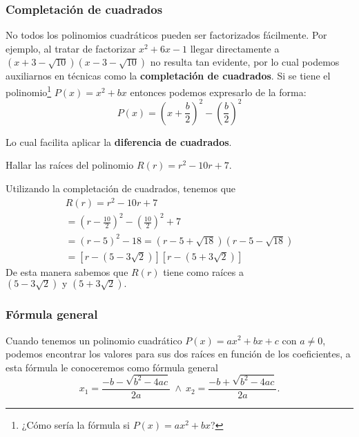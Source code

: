 \subsubsection{Completación de cuadrados}

No todos los polinomios cuadráticos pueden ser factorizados fácilmente.
Por ejemplo, al tratar de factorizar $x^2 + 6x - 1$ llegar directamente a $(x + 3 - \sqrt {10})(x-3-\sqrt {10})$ no resulta tan evidente, por lo cual podemos auxiliarnos en técnicas como la \textbf{completación de cuadrados}.
Si se tiene el polinomio\footnote{¿Cómo sería la fórmula si $P(x) = ax^2 + bx$?} $P(x) = x^2 + bx$ entonces podemos expresarlo de la forma:
\[
    P(x) = \left( x + \frac{b}{2} \right)^2 - \left( \frac{b}{2} \right)^2
\]

Lo cual facilita aplicar la \textbf{diferencia de cuadrados}.

\begin{section-example.tcb}
    Hallar las raíces del polinomio $R(r) = r^2 - 10r + 7.$
\end{section-example.tcb}
\begin{solution}
{
    Utilizando la completación de cuadrados, tenemos que
    \begin{gather*}
        R(r) = r^2 - 10r + 7\\
        = \left( r - \frac{10}{2} \right)^2 - \left( \frac{10}{2} \right)^2 + 7\\
        = \left( r - 5 \right)^2 - 18
        = \left( r - 5 + \sqrt {18} \right)\left( r - 5 - \sqrt {18} \right)\\
        = \left[ r - \left( 5 - 3\sqrt {2} \right)\right]\left[ r - \left( 5 + 3\sqrt {2} \right)\right]
    \end{gather*}
    De esta manera sabemos que $R(r)$ tiene como raíces a $\left( 5 - 3\sqrt {2} \right) \mbox{ y } \left( 5 + 3\sqrt {2} \right).$
}
\end{solution}


\subsubsection{Fórmula general}

Cuando tenemos un polinomio cuadrático $P(x) = ax^2 + bx + c$ con $a \neq 0$, podemos encontrar los valores para sus dos raíces en función de los coeficientes, a esta fórmula le conoceremos como fórmula general
\[
    x_1 = \frac{-b - \sqrt {b^2 - 4ac}}{2a}\ \land \ x_2 = \frac{-b + \sqrt {b^2 - 4ac}}{2a}.
\]

